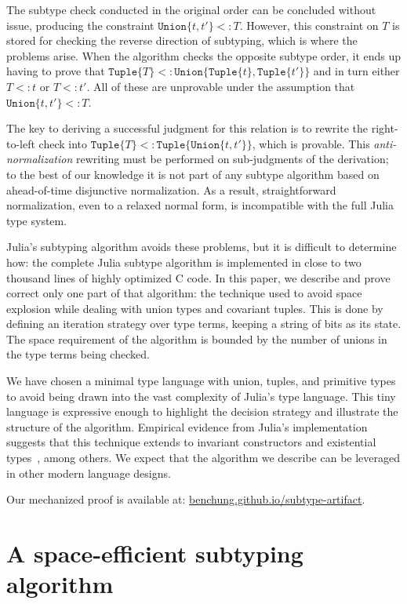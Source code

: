 \documentclass[a4paper,english]{lipics-v2019}
\newcommand{\xt}[1]{\texttt{#1}}
\newcommand{\union}[2]{\xt{Union\{}#1,#2\xt{\}}}
\newcommand{\tuple}[1]{\xt{Tuple\{}#1\xt{\}}}
\begin{document}
The subtype check conducted in the original order can be concluded without
issue, producing the constraint {\small$\union{t}{t'} <: T$}. However, this
constraint on $T$ is stored for checking the reverse direction of subtyping,
which is where the problems arise. When the algorithm checks the opposite
subtype order, it ends up having to prove that
{\small$\tuple{T}<:\union{\tuple{t}}{\tuple{t'}}$} and in turn either
{\small$T<:t$} or {\small$T<:t'$}. All of these are unprovable under the
assumption that {\small$\union{t}{t'} <: T$}.

The key to deriving a successful judgment for this relation is to rewrite the
right-to-left check into {\small$\tuple{T}<:\tuple{\union{t}{t'}}$}, which is
provable. This \emph{anti-normalization} rewriting must be performed on
sub-judgments of the derivation; to the best of our knowledge it is not
part of any subtype algorithm based on ahead-of-time disjunctive
normalization. As a result, straightforward normalization, even to a relaxed
normal form, is incompatible with the full Julia type system.

Julia's subtyping algorithm avoids these problems, but it is difficult to
determine how: the complete Julia subtype algorithm is implemented in close to
two thousand lines of highly optimized C code. In this paper, we describe and
prove correct only one part of that algorithm: the technique used to avoid
space explosion while dealing with union types and covariant tuples. This is
done by defining an iteration strategy over type terms, keeping a string of
bits as its state. The space requirement of the algorithm is bounded by the
number of unions in the type terms being checked.

We have chosen a minimal type language with union, tuples, and primitive types
to avoid being drawn into the vast complexity of Julia's type language. This
tiny language is expressive enough to highlight the decision strategy and
illustrate the structure of the algorithm. Empirical evidence from Julia's
implementation suggests that this technique extends to invariant constructors
and existential types~\cite{DBLP:NardelliBPCBV18}, among others. We expect
that the algorithm we describe can be leveraged in other modern language
designs.

\medskip
Our mechanized proof is available at: {\small\url{benchung.github.io/subtype-artifact}}.

\section{A space-efficient subtyping algorithm}
\end{document}
